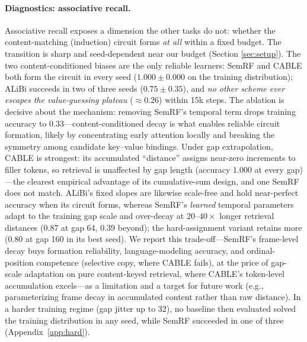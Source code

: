 {\paragraph{Diagnostics: associative recall.}
Associative recall exposes a dimension the other tasks do not: whether the
content-matching (induction) circuit forms \emph{at all} within a fixed budget.
The transition is sharp and seed-dependent near our budget (Section
\ref{sec:setup}). The two content-conditioned biases are the only reliable
learners: SemRF and CABLE both form the circuit in every seed
($1.000 \pm 0.000$ on the training distribution); ALiBi succeeds in two of
three seeds ($0.75 \pm 0.35$), and \emph{no other scheme ever escapes the
value-guessing plateau} ($\approx 0.26$) within 15k steps. The ablation is
decisive about the mechanism: removing SemRF's temporal term drops training
accuracy to $0.33$---content-conditioned decay is what enables reliable
circuit formation, likely by concentrating early attention locally and
breaking the symmetry among candidate key--value bindings. Under gap
extrapolation, CABLE is strongest: its accumulated ``distance'' assigns
near-zero increments to filler tokens, so retrieval is unaffected by gap
length (accuracy $1.000$ at every gap)---the clearest empirical advantage of
its cumulative-sum design, and one SemRF does not match. ALiBi's fixed slopes
are likewise scale-free and hold near-perfect accuracy when its circuit
forms, whereas SemRF's \emph{learned} temporal parameters adapt to the
training gap scale and over-decay at $20$--$40\times$ longer retrieval
distances ($0.87$ at gap 64, $0.39$ beyond); the hard-assignment variant
retains more ($0.80$ at gap 160 in its best seed). We report this
trade-off---SemRF's frame-level decay buys formation reliability,
language-modeling accuracy, and ordinal-position competence (selective copy,
where CABLE fails), at the price of gap-scale adaptation on pure
content-keyed retrieval, where CABLE's token-level accumulation excels---as a
limitation and a target for future work (e.g., parameterizing frame decay in
accumulated content rather than raw distance). In a harder training regime
(gap jitter up to 32), no baseline then evaluated solved the training
distribution in any seed, while SemRF succeeded in one of three
(Appendix~\ref{app:hard}).}


